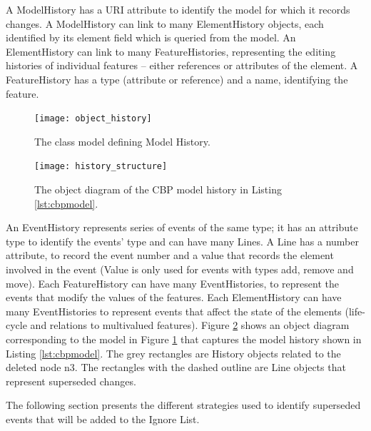 A \textsf{ModelHistory} has a \textsf{URI} attribute to identify the model for which it records changes.  A \textsf{ModelHistory} can link to many \textsf{ElementHistory} objects, each identified by its \textsf{element} field which is queried from the model. An \textsf{ElementHistory} can link to many \textsf{FeatureHistories}, representing the editing histories of individual features -- either references or attributes of the element. A \textsf{FeatureHistory} has a \textsf{type} (attribute or reference) and a \textsf{name}, identifying the feature.

\begin{figure}[ht]
\centering
\texttt{[image: object\_history]}
\caption{The class model defining Model History.}
\label{fig:object_history}
\end{figure}

\begin{figure}[ht]
\centering
\texttt{[image: history\_structure]}
\caption{The object diagram of the CBP model history in Listing \ref{lst:cbpmodel}.}
\label{fig:history_structure}
\end{figure}

An \textsf{EventHistory} represents series of events of the same type; it has an attribute \textsf{type} to identify the events' type and can have many \textsf{Line}s. A \textsf{Line} has a \textsf{number} attribute, to record the event number and a \textsf{value} that records the element involved in the event (Value is only used for events with types \textsf{add}, \textsf{remove} and \textsf{move}). Each \textsf{FeatureHistory} can have many \textsf{EventHistories}, to represent the events that modify the values of the features. Each \textsf{ElementHistory} can have many \textsf{EventHistories} to represent events that affect the state of the elements (life-cycle and relations to multivalued features). Figure \ref{fig:history_structure} shows an object diagram corresponding to the model in Figure \ref{fig:object_history} that captures the model history shown in Listing \ref{lst:cbpmodel}. The grey rectangles are \textsf{History} objects related to the deleted node \textsf{n3}. The rectangles with the dashed outline are \textsf{Line} objects that represent superseded changes. 

The following section presents the different strategies used to identify superseded events that will be added to the Ignore List.   

